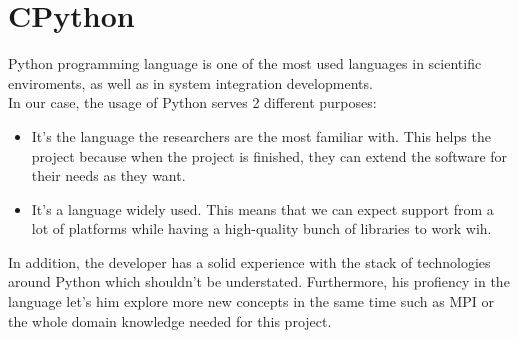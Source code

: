 \section{CPython}

Python\cite{Python} programming language is one of the most used languages
in scientific enviroments, as well as in system integration developments.\\

In our case, the usage of Python serves 2 different purposes:
\begin{itemize}
  \item It's the language the researchers are the most familiar with. This
  helps the project because when the project is finished, they can extend the
  software for their needs as they want.
  \item It's a language widely used. This means that we can expect support from
  a lot of platforms while having a high-quality bunch of libraries to work
  wih.
\end{itemize}


In addition, the developer has a solid experience with the stack of
technologies around Python which shouldn't be understated. Furthermore, his
profiency in the language let's him explore more new concepts in the same time
such as MPI or the whole domain knowledge needed for this project.\\

